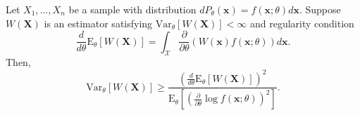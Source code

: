 \begin{theorem} \label{theorem:CRI}
Let $X_1, \ldots, X_n$ be a sample with distribution $dP_{\theta} (\mathbf{x}) = f(\mathbf{x}; \theta) d\mathbf{x}$.
Suppose $W(\mathbf{X})$ is an estimator satisfying $\mathrm{Var}_{\theta} \left[ W(\mathbf{X}) \right] < \infty$ and regularity condition
\begin{equation*}
\frac{d}{d\theta} \mathrm{E}_{\theta} \left[ W(\mathbf{X}) \right]
= \int_{\mathcal{X}} \frac{\partial}{\partial \theta} \left( W(\mathbf{x}) f(\mathbf{x}; \theta) \right) d\mathbf{x} .
\end{equation*}
Then,
\begin{equation} \label{equation:CRI}
\mathrm{Var}_{\theta} \left[ W(\mathbf{X}) \right]
\geq \frac{\left( \frac{d}{d\theta} \mathrm{E}_{\theta} \left[ W(\mathbf{X}) \right] \right)^2}
{\mathrm{E}_{\theta} \left[ \left( \frac{\partial}{\partial \theta} \log f(\mathbf{x}; \theta) \right)^2 \right]} .
\end{equation}
\end{theorem}
